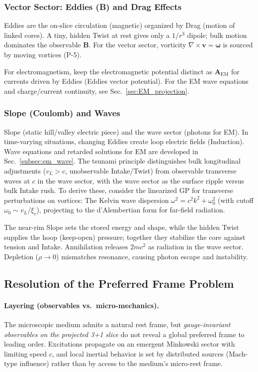 \subsubsection{Vector Sector: Eddies (B) and Drag Effects}

Eddies are the on-slice circulation (magnetic) organized by Drag (motion of linked cores). A tiny, hidden Twist at rest gives only a $1/r^3$ dipole; bulk motion dominates the observable $\mathbf B$. For the vector sector, vorticity $\nabla \times \mathbf{v} = \boldsymbol{\omega}$ is sourced by moving vortices (P-5).

For electromagnetism, keep the electromagnetic potential distinct as $\mathbf A_{\text{EM}}$ for currents driven by Eddies (Eddies vector potential). For the EM wave equations and charge/current continuity, see Sec.~\ref{sec:EM_projection}.

\subsubsection{Slope (Coulomb) and Waves}

Slope (static hill/valley electric piece) and the wave sector (photons for EM). In time-varying situations, changing Eddies create loop electric fields (Induction). Wave equations and retarded solutions for EM are developed in Sec.~\ref{subsec:em_wave}. The tsunami principle distinguishes bulk longitudinal adjustments ($v_L > c$, unobservable Intake/Twist) from observable transverse waves at $c$ in the wave sector, with the wave sector as the surface ripple versus bulk Intake rush. To derive these, consider the linearized GP for transverse perturbations on vortices: The Kelvin wave dispersion $\omega^2 = c^2 k^2 + \omega_0^2$ (with cutoff $\omega_0 \sim v_L / \xi_c$), projecting to the d'Alembertian form for far-field radiation.

The near-rim Slope sets the stored energy and shape, while the hidden Twist supplies the hoop (keep-open) pressure; together they stabilize the core against tension and Intake. Annihilation releases $2mc^2$ as radiation in the wave sector. Depletion ($\rho \to 0$) mismatches resonance, causing photon escape and instability.

\subsection{Resolution of the Preferred Frame Problem}
\label{subsec:preferred-frame}

\paragraph*{Layering (observables vs.\ micro-mechanics).}
The microscopic medium admits a natural rest frame, but \emph{gauge-invariant observables on the projected 3+1 slice} do not reveal a global preferred frame to leading order. Excitations propagate on an emergent Minkowski sector with limiting speed $c$, and local inertial behavior is set by distributed sources (Mach-type influence) rather than by access to the medium's micro-rest frame.

